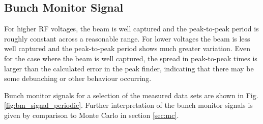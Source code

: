 \documentclass{paper}
\begin{document}
\subsection{Bunch Monitor Signal}
For higher RF voltages, the beam is well captured and the peak-to-peak period is
roughly constant across a reasonable range. For lower voltages the beam is less 
well captured and the peak-to-peak period shows much greater variation. Even for 
the case where the beam is well captured, the spread in peak-to-peak times is 
larger than the calculated error in the peak finder, indicating that there may 
be some debunching or other behaviour occurring.

Bunch monitor signals for a selection of the measured data sets are shown in 
Fig. \ref{fig:bm_signal_periodic}. Further interpretation of the bunch monitor 
signals is given by comparison to Monte Carlo in section \ref{sec:mc}.
\end{document}
